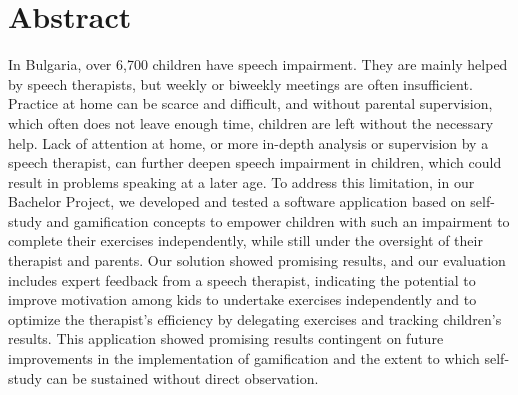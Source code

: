 \chapter*{Abstract}

In Bulgaria, over 6,700 children have speech impairment. They are mainly helped by speech therapists, but weekly or biweekly meetings are often insufficient. Practice at home can be scarce and difficult, and without parental supervision, which often does not leave enough time, children are left without the necessary help. Lack of attention at home, or more in-depth analysis or supervision by a speech therapist, can further deepen speech impairment in children, which could result in problems speaking at a later age. To address this limitation, in our Bachelor Project, we developed and tested a software application based on self-study and gamification concepts to empower children with such an impairment to complete their exercises independently, while still under the oversight of their therapist and parents. Our solution showed promising results, and our evaluation includes expert feedback from a speech therapist, indicating the potential to improve motivation among kids to undertake exercises independently and to optimize the therapist's efficiency by delegating exercises and tracking children's results. This application showed promising results contingent on future improvements in the implementation of gamification and the extent to which self-study can be sustained without direct observation.
